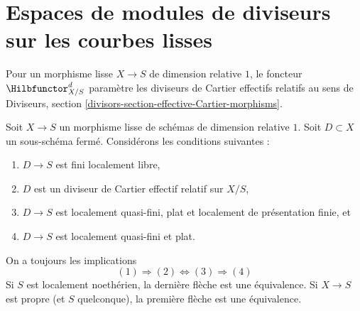 \section{Espaces de modules de diviseurs sur les courbes lisses}
\label{section-divisors}

\noindent
Pour un morphisme lisse $X \to S$ de dimension relative $1$, le foncteur
$\Hilbfunctor^d_{X/S}$ paramètre les diviseurs de Cartier effectifs relatifs
au sens de
Diviseurs, section \ref{divisors-section-effective-Cartier-morphisms}.

\begin{lemma}
\label{lemma-divisors-on-curves}
Soit $X \to S$ un morphisme lisse de schémas de dimension relative $1$.
Soit $D \subset X$ un sous-schéma fermé. Considérons les conditions suivantes :
\begin{enumerate}
\item $D \to S$ est fini localement libre,
\item $D$ est un diviseur de Cartier effectif relatif sur $X/S$,
\item $D \to S$ est localement quasi-fini, plat et
localement de présentation finie, et
\item $D \to S$ est localement quasi-fini et plat.
\end{enumerate}
On a toujours les implications
$$
(1) \Rightarrow (2) \Leftrightarrow (3) \Rightarrow (4)
$$
Si $S$ est localement noethérien, la dernière flèche est une équivalence.
Si $X \to S$ est propre (et $S$ quelconque), la première flèche est
une équivalence.
\end{lemma}

